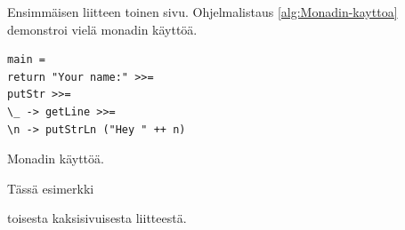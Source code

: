 \newpage{}

Ensimmäisen liitteen toinen sivu. Ohjelmalistaus \ref{alg:Monadin-kayttoa}
demonstroi vielä monadin käyttöä.

\begin{algorithm}[tbh]
\begin{verbatim}
main =
return "Your name:" >>=
putStr >>=
\_ -> getLine >>=
\n -> putStrLn ("Hey " ++ n)
\end{verbatim}

\caption{Monadin käyttöä.\label{alg:Monadin-kayttoa}}
\end{algorithm}



Tässä esimerkki\pagebreak{}

toisesta kaksisivuisesta liitteestä.

